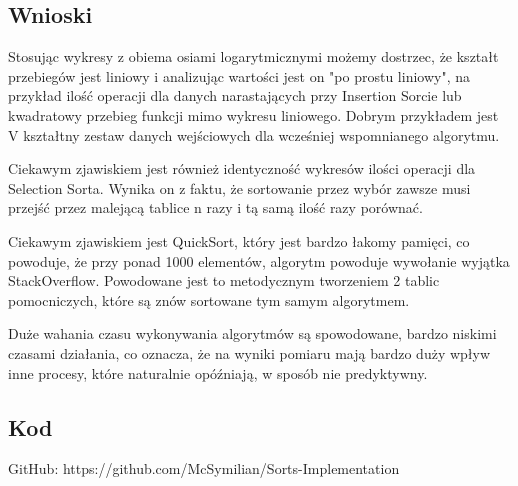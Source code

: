 \documentclass[11pt,a4paper]{article}
\begin{document}
\subsection{Wnioski}

Stosując wykresy z obiema osiami logarytmicznymi możemy dostrzec, że kształt przebiegów jest liniowy i analizując wartości jest on "po prostu liniowy", na przykład ilość operacji dla danych narastających przy Insertion Sorcie lub kwadratowy przebieg funkcji mimo wykresu liniowego. Dobrym przykładem jest V kształtny zestaw danych wejściowych dla wcześniej wspomnianego algorytmu.

Ciekawym zjawiskiem jest również identyczność wykresów ilości operacji dla Selection Sorta. Wynika on z faktu, że sortowanie przez wybór zawsze musi przejść przez malejącą tablice n razy i tą samą ilość razy porównać.

Ciekawym zjawiskiem jest QuickSort, który jest bardzo łakomy pamięci, co powoduje, że przy ponad 1000 elementów, algorytm powoduje wywołanie wyjątka StackOverflow. Powodowane jest to metodycznym tworzeniem 2 tablic pomocniczych, które są znów sortowane tym samym algorytmem. 

Duże wahania czasu wykonywania algorytmów są spowodowane, bardzo niskimi czasami działania, co oznacza, że na wyniki pomiaru mają bardzo duży wpływ inne procesy, które naturalnie opóźniają, w sposób nie predyktywny.

\subsection{Kod}
GitHub: https://github.com/McSymilian/Sorts-Implementation
\end{document}
